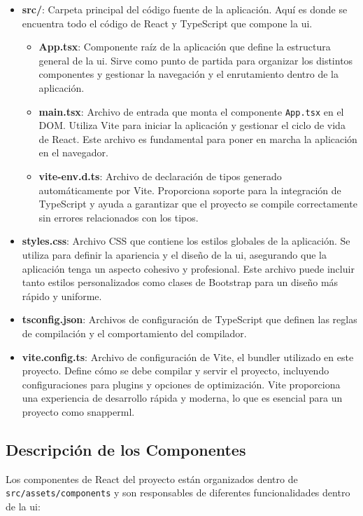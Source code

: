 \begin{itemize}
    \item \textbf{src/}: Carpeta principal del código fuente de la aplicación. Aquí es donde se encuentra todo el código de React y TypeScript que compone la \acrshort{ui}.
          \begin{itemize}
              \item \textbf{App.tsx}: Componente raíz de la aplicación que define la estructura general de la \acrshort{ui}. Sirve como punto de partida para organizar los distintos componentes y gestionar la navegación y el enrutamiento dentro de la aplicación.
              \item \textbf{main.tsx}: Archivo de entrada que monta el componente \texttt{App.tsx} en el DOM. Utiliza Vite para iniciar la aplicación y gestionar el ciclo de vida de React. Este archivo es fundamental para poner en marcha la aplicación en el navegador.
              \item \textbf{vite-env.d.ts}: Archivo de declaración de tipos generado automáticamente por Vite. Proporciona soporte para la integración de TypeScript y ayuda a garantizar que el proyecto se compile correctamente sin errores relacionados con los tipos.
          \end{itemize}

    \item \textbf{styles.css}: Archivo CSS que contiene los estilos globales de la aplicación. Se utiliza para definir la apariencia y el diseño de la \acrshort{ui}, asegurando que la aplicación tenga un aspecto cohesivo y profesional. Este archivo puede incluir tanto estilos personalizados como clases de Bootstrap para un diseño más rápido y uniforme.

    \item \textbf{tsconfig.json}: Archivos de configuración de TypeScript que definen las reglas de compilación y el comportamiento del compilador.

    \item \textbf{vite.config.ts}: Archivo de configuración de Vite, el bundler utilizado en este proyecto. Define cómo se debe compilar y servir el proyecto, incluyendo configuraciones para plugins y opciones de optimización. Vite proporciona una experiencia de desarrollo rápida y moderna, lo que es esencial para un proyecto como \Gls{snapperml}.

\end{itemize}

\subsection{Descripción de los Componentes}
Los componentes de React del proyecto están organizados dentro de \texttt{src/assets/components} y son responsables de diferentes funcionalidades dentro de la \acrshort{ui}:


